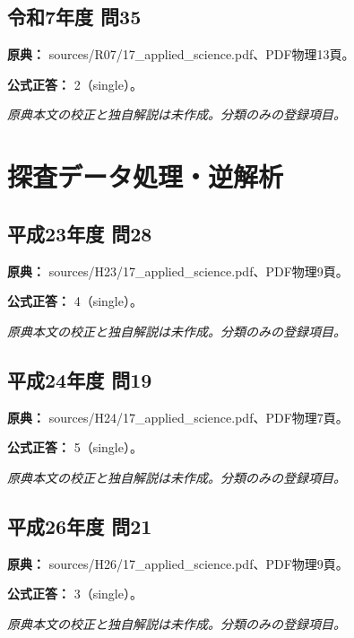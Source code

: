 \subsection{令和7年度 問35}
\label{q:r07-reg-applied-35}

\noindent\textbf{原典：} sources/R07/17\_applied\_science.pdf、PDF物理13頁。

\textbf{公式正答：} 2（single）。

\par\textit{原典本文の校正と独自解説は未作成。分類のみの登録項目。}

\section{探査データ処理・逆解析}

\subsection{平成23年度 問28}
\label{q:h23-reg-applied-28}

\noindent\textbf{原典：} sources/H23/17\_applied\_science.pdf、PDF物理9頁。

\textbf{公式正答：} 4（single）。

\par\textit{原典本文の校正と独自解説は未作成。分類のみの登録項目。}

\subsection{平成24年度 問19}
\label{q:h24-reg-applied-19}

\noindent\textbf{原典：} sources/H24/17\_applied\_science.pdf、PDF物理7頁。

\textbf{公式正答：} 5（single）。

\par\textit{原典本文の校正と独自解説は未作成。分類のみの登録項目。}

\subsection{平成26年度 問21}
\label{q:h26-reg-applied-21}

\noindent\textbf{原典：} sources/H26/17\_applied\_science.pdf、PDF物理9頁。

\textbf{公式正答：} 3（single）。

\par\textit{原典本文の校正と独自解説は未作成。分類のみの登録項目。}

